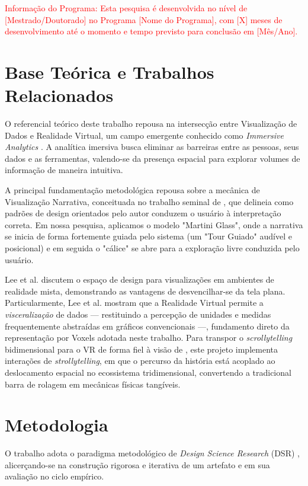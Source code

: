 \documentclass[12pt]{article}
\begin{document}
\textcolor{red}{Informação do Programa: Esta pesquisa é desenvolvida no nível de [Mestrado/Doutorado] no Programa [Nome do Programa], com [X] meses de desenvolvimento até o momento e tempo previsto para conclusão em [Mês/Ano].}

\section{Base Teórica e Trabalhos Relacionados}

O referencial teórico deste trabalho repousa na intersecção entre Visualização de Dados e Realidade Virtual, um campo emergente conhecido como \textit{Immersive Analytics} \cite{marriott2018immersive, ens2021grand}. A analítica imersiva busca eliminar as barreiras entre as pessoas, seus dados e as ferramentas, valendo-se da presença espacial para explorar volumes de informação de maneira intuitiva.

A principal fundamentação metodológica repousa sobre a mecânica de Visualização Narrativa, conceituada no trabalho seminal de \cite{segel2010narrative}, que delineia como padrões de design orientados pelo autor conduzem o usuário à interpretação correta. Em nossa pesquisa, aplicamos o modelo "Martini Glass", onde a narrativa se inicia de forma fortemente guiada pelo sistema (um "Tour Guiado" audível e posicional) e em seguida o "cálice" se abre para a exploração livre conduzida pelo usuário.

Lee et al. \cite{lee2022design} discutem o espaço de design para visualizações em ambientes de realidade mista, demonstrando as vantagens de desvencilhar-se da tela plana. Particularmente, Lee et al. \cite{lee2021visceralization} mostram que a Realidade Virtual permite a \textit{visceralização} de dados --- restituindo a percepção de unidades e medidas frequentemente abstraídas em gráficos convencionais ---, fundamento direto da representação por Voxels adotada neste trabalho. Para transpor o \textit{scrollytelling} bidimensional para o VR de forma fiel à visão de \cite{segel2010narrative}, este projeto implementa interações de \textit{strollytelling}, em que o percurso da história está acoplado ao deslocamento espacial no ecossistema tridimensional, convertendo a tradicional barra de rolagem em mecânicas físicas tangíveis.

\section{Metodologia}

O trabalho adota o paradigma metodológico de \textit{Design Science Research} (DSR) \cite{hevner2004design}, alicerçando-se na construção rigorosa e iterativa de um artefato e em sua avaliação no ciclo empírico.
\end{document}
